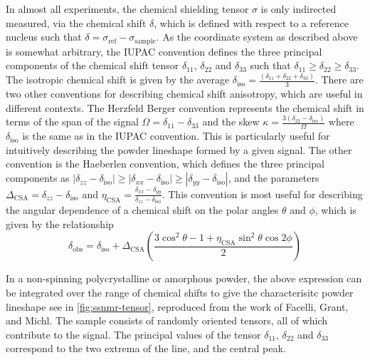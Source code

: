 \begin{refsection}
In almost all experiments, the chemical shielding tensor $\sigma$ is only indirected measured, via the chemical shift $\delta$, which is defined with respect to a reference nucleus such that $\delta = \sigma_{\textrm{ref}} - \sigma_{\textrm{sample}}$.
As the coordinate system as described above is somewhat arbitrary, the IUPAC convention defines the three principal components of the chemical shift tensor $\delta_{11}$, $\delta_{22}$ and $\delta_{33}$ such that $\delta_{11} \geq \delta_{22} \geq \delta_{33}$.
The isotropic chemical shift is given by the average $\delta_{\textrm{iso}} = \frac{(\delta_{11} + \delta_{22} + \delta_{33})}{3}$.
There are two other conventions for describing chemical shift anisotropy, which are useful in different contexts.
The Herzfeld Berger convention represents the chemical shift in terms of the span of the signal $\Omega = \delta_{11} - \delta_{33}$ and the skew $\kappa = \frac{3(\delta_{22} - \delta_{\textrm{iso}})}{\Omega}$ where $\delta_{\textrm{iso}}$ is the same as in the IUPAC convention.
This is particularly useful for intuitively describing the powder lineshape formed by a given signal.
The other convention is the Haeberlen convention, which defines the three principal components as $|\delta_{zz} - \delta_{\textrm{iso}}| \geq |\delta_{xx} - \delta_{\textrm{iso}}| \geq |\delta_{yy} - \delta_{\textrm{iso}}|$, and the parameters $\Delta_{\textrm{CSA}} = \delta_{zz} -\delta_{\textrm{iso}}$ and $\eta_{\textrm{CSA}} = \frac{\delta_{xx} - \delta_{yy}}{\delta_{zz} -\delta_{\textrm{iso}}}$.
This convention is most useful for describing the angular dependence of a chemical shift on the polar angles $\theta$ and $\phi$, which is given by the relationship\autocite{Haeberlen1976}
\begin{equation}
  \delta_{\textrm{obs}} = \delta_{\textrm{iso}} + \Delta_{\textrm{CSA}} \left(\frac{3 \cos^2 \theta - 1 + \eta_{\textrm{CSA}} \sin^2 \theta \cos 2 \phi}{2} \right)
  \label{eqn:orientation-csa}
\end{equation}

In a non-spinning polycrystalline or amorphous powder, the above expression can be integrated over the range of chemical shifts to give the characterisitc powder lineshape see in \cref{fig:ssnmr-tensor}, reproduced from the work of Facelli, Grant, and Michl.\autocite{Facelli1987Carbon-13Determination}
The sample consists of randomly oriented tensors, all of which contribute to the signal.
The principal values of the tensor $\delta_{11}$, $\delta_{22}$ and $\delta_{33}$ correspond to the two extrema of the line, and the central peak.


\end{refsection}
